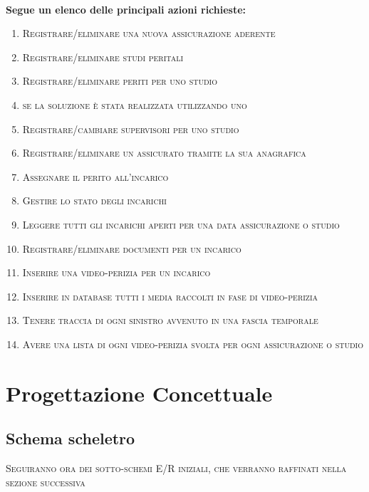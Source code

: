 \documentclass[a4paper,12pt]{report}
\begin{document}
\\
\textbf{Segue un elenco delle principali azioni richieste:}
\begin{enumerate}
    \item \textsc{Registrare/eliminare una nuova assicurazione aderente}
    \item \textsc{Registrare/eliminare studi peritali}
    \item \textsc{Registrare/eliminare periti per uno studio}
    \item \textsc{se la soluzione è stata realizzata utilizzando uno}
    \item \textsc{Registrare/cambiare supervisori per uno studio}
    \item \textsc{Registrare/eliminare un assicurato tramite la sua anagrafica}
    \item \textsc{Assegnare il perito all'incarico}
    \item \textsc{Gestire lo stato degli incarichi}
    \item \textsc{Leggere tutti gli incarichi aperti per una data assicurazione o studio}
    \item \textsc{Registrare/eliminare documenti per un incarico}
    \item \textsc{Inserire una video-perizia per un incarico}
    \item \textsc{Inserire in database tutti i media raccolti in fase di video-perizia}
    \item \textsc{Tenere traccia di ogni sinistro avvenuto in una fascia temporale}
    \item \textsc{Avere una lista di ogni video-perizia svolta per ogni assicurazione o studio}
\end{enumerate}


\chapter{Progettazione Concettuale}

\section{Schema scheletro}

\textsc{Seguiranno ora dei sotto-schemi E/R iniziali, che verranno raffinati nella sezione successiva}
\end{document}
